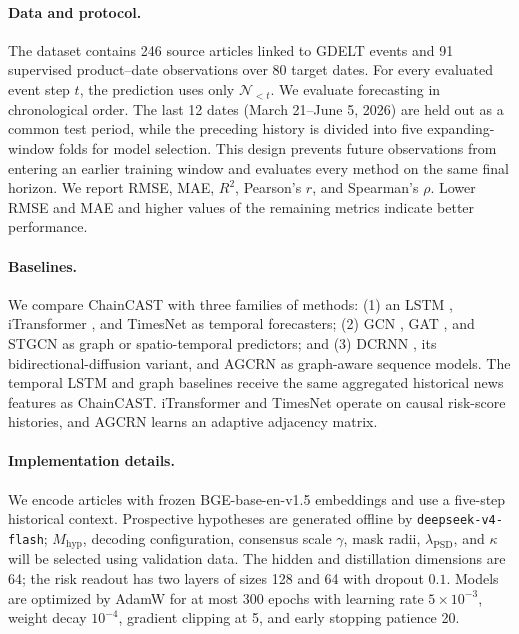 \documentclass[letterpaper]{article} %
\begin{document}
\paragraph{Data and protocol.}
The dataset contains 246 source articles linked to GDELT events and 91 supervised product--date observations over 80 target dates. For every evaluated event step \(t\), the prediction uses only \(\mathcal N_{<t}\). We evaluate forecasting in chronological order. The last 12 dates (March 21--June 5, 2026) are held out as a common test period, while the preceding history is divided into five expanding-window folds for model selection. This design prevents future observations from entering an earlier training window and evaluates every method on the same final horizon. We report RMSE, MAE, \(R^2\), Pearson's \(r\), and Spearman's \(\rho\). Lower RMSE and MAE and higher values of the remaining metrics indicate better performance.

\paragraph{Baselines.}
We compare ChainCAST with three families of methods: (1) an LSTM \cite{hochreiter1997long}, iTransformer \cite{liu2024itransformer}, and TimesNet \cite{wu2023timesnet} as temporal forecasters; (2) GCN \cite{kipf2017semi}, GAT \cite{velickovic2018graph}, and STGCN \cite{DBLP:conf/ijcai/YuYZ18} as graph or spatio-temporal predictors; and (3) DCRNN \cite{DBLP:conf/iclr/LiYS018}, its bidirectional-diffusion variant, and AGCRN \cite{DBLP:conf/nips/0001YL0020} as graph-aware sequence models. The temporal LSTM and graph baselines receive the same aggregated historical news features as ChainCAST. iTransformer and TimesNet operate on causal risk-score histories, and AGCRN learns an adaptive adjacency matrix.

\paragraph{Implementation details.}
We encode articles with frozen BGE-base-en-v1.5 embeddings and use a five-step historical context. Prospective hypotheses are generated offline by \texttt{deepseek-v4-flash}; \(M_{\mathrm{hyp}}\), decoding configuration, consensus scale \(\gamma\), mask radii, \(\lambda_{\mathrm{PSD}}\), and \(\kappa\) will be selected using validation data. The hidden and distillation dimensions are 64; the risk readout has two layers of sizes 128 and 64 with dropout \(0.1\). Models are optimized by AdamW for at most 300 epochs with learning rate \(5\times10^{-3}\), weight decay \(10^{-4}\), gradient clipping at 5, and early stopping patience 20.
\end{document}
